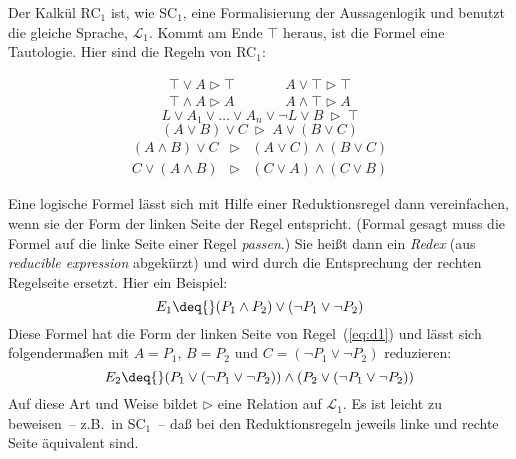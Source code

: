 Der Kalkül RC$_1$ ist, wie SC$_1$, eine Formalisierung der Aussagenlogik und
benutzt die gleiche Sprache, $\mathcal{L}_1$.  Kommt am Ende $\top$ heraus, ist
die Formel eine Tautologie.  Hier sind die Regeln von RC$_1$:
%
\begin{definition}
\begin{eqnarray}
    \top\vee A\triangleright \top &\qquad& A\vee\top \triangleright\top\label{eq:e1}\\%
    \top\wedge A\triangleright A &\qquad& A\wedge\top\triangleright A\label{eq:e2}%
\end{eqnarray}
\begin{equation}
  L\vee A_1\vee\ldots \vee A_n\vee\neg L\vee B\:\triangleright\: \top\label{eq:t}%
\end{equation}
\begin{equation}
  (A\vee B)\vee C\:\triangleright\: A\vee(B\vee C)\label{eq:a}%
\end{equation}
\begin{eqnarray}
  (A\wedge B)\vee C&\triangleright& (A\vee C)\wedge (B\vee C)\label{eq:d1}\\%
  C\vee(A\wedge B)&\triangleright& (C\vee A)\wedge (C\vee B)\label{eq:d2}%
\end{eqnarray}
\end{definition}
%
Eine logische Formel lässt sich
mit Hilfe einer Reduktionsregel dann vereinfachen, wenn sie der Form
der linken Seite der Regel entspricht.  (Formal gesagt muss die Formel
auf die linke Seite einer Regel \textit{passen}.)  
Sie heißt dann ein \emph{Redex} (aus
\emph{reducible expression} abgekürzt) und wird durch die
Entsprechung der rechten Regelseite ersetzt.  Hier ein Beispiel:
%
\begin{displaymath}
  E_1 \deq{} (P_1\wedge P_2)\vee (\neg
    P_1\vee \neg P_2)
\end{displaymath}
%
Diese Formel hat die Form der linken Seite von Regel~(\ref{eq:d1}) und lässt
sich folgendermaßen mit $A=P_1$,
$B=P_2$ und $C=(\neg P_1\vee\neg{P_2})$
reduzieren:
%
\begin{displaymath}
  E_2 \deq{} (P_1\vee(\neg P_1\vee\neg{P_2}))\wedge 
  (P_2\vee(\neg P_1\vee\neg{P_2}))
\end{displaymath}
%
Auf
diese Art und Weise bildet $\triangleright$ eine Relation auf
$\mathcal{L}_1$.
Es ist leicht zu beweisen~-- z.B.\ in SC$_1$~-- daß bei den
Reduktionsregeln jeweils linke und rechte Seite äquivalent sind.

